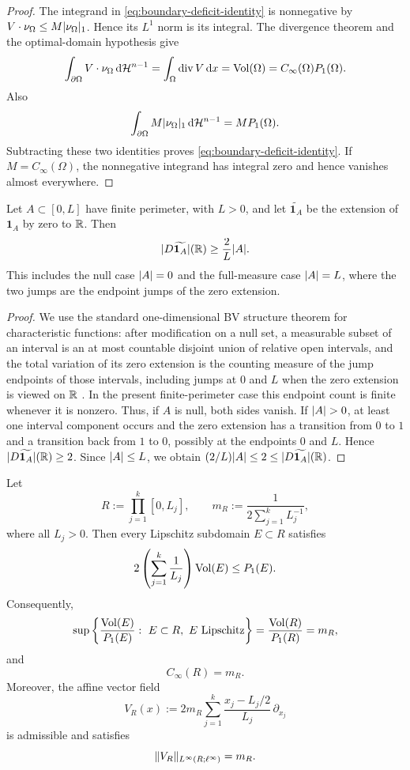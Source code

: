 \begin{proof}
The integrand in \eqref{eq:boundary-deficit-identity} is nonnegative by
$V\cdot\nu_\Omega\le M\lvert \nu_\Omega \rvert_1$. Hence its $L^1$ norm is its
integral. The divergence theorem and the optimal-domain hypothesis give
\[
\int_{\partial\Omega}V\cdot\nu_\Omega\,\mathrm{d}\mathcal{H}^{n-1}
=\int_\Omega\operatorname{div} V\,\mathrm{d} x
=\operatorname{Vol}(\Omega)
=C_\infty(\Omega)P_1(\Omega).
\]
Also
\[
\int_{\partial\Omega}M\lvert \nu_\Omega \rvert_1\,\mathrm{d}\mathcal{H}^{n-1}
=M P_1(\Omega).
\]
Subtracting these two identities proves
\eqref{eq:boundary-deficit-identity}. If $M=C_\infty(\Omega)$, the
nonnegative integrand has integral zero and hence vanishes almost everywhere.

\end{proof}

\begin{lemma}
\label{lem:one-dimensional-zero-extension}
Let $A\subset[0,L]$ have finite perimeter, with $L>0$, and let
$\widetilde{\mathbf 1_A}$ be the extension of $\mathbf 1_A$ by zero to
$\mathbb{R}$. Then
\[
|D\widetilde{\mathbf 1_A}|(\mathbb{R})\ge \frac{2}{L}\lvert A \rvert.
\]
This includes the null case $\lvert A \rvert=0$ and the full-measure case
$\lvert A \rvert=L$, where the two jumps are the endpoint jumps of the zero extension.
\end{lemma}

\begin{proof}
We use the standard one-dimensional BV structure theorem for characteristic
functions: after modification on a null set, a measurable subset of an interval
is an at most countable disjoint union of relative open intervals, and the total
variation of its zero extension is the counting measure of the jump endpoints
of those intervals, including jumps at $0$ and $L$ when the zero extension is
viewed on $\mathbb{R}$ \cite[Sec.~5.10]{EvansGariepy2015}.  In the present
finite-perimeter case this endpoint count is finite whenever it is nonzero.
Thus, if $A$ is null, both sides vanish. If $\lvert A \rvert>0$, at least one interval
component occurs and the zero extension has a transition from $0$ to $1$ and a
transition back from $1$ to $0$, possibly at the endpoints $0$ and $L$. Hence
$|D\widetilde{\mathbf 1_A}|(\mathbb{R})\ge2$. Since $\lvert A \rvert\le L$, we obtain
$(2/L)\lvert A \rvert\le2\le |D\widetilde{\mathbf 1_A}|(\mathbb{R})$.
\end{proof}

\begin{lemma}
\label{lem:box-self-cheeger}
Let
\[
R:=\prod_{j=1}^k[0,L_j],
\qquad
m_R:=\frac{1}{2\sum_{j=1}^k L_j^{-1}},
\]
where all $L_j>0$. Then every Lipschitz subdomain $E\subset R$ satisfies
\begin{equation}
\label{eq:box-anisotropic-ineq}
2\left(\sum_{j=1}^k\frac1{L_j}\right)\operatorname{Vol}(E)\le P_1(E).
\end{equation}
Consequently,
\[
\sup\left\{\frac{\Vol(E)}{P_1(E)}:\ E\subset R,\ E\ {\rm Lipschitz}\right\}
=
\frac{\Vol(R)}{P_1(R)}
=m_R,
\]
and
\[
C_\infty(R)=m_R.
\]
Moreover, the affine vector field
\[
V_R(x):=
2m_R\sum_{j=1}^k
\frac{x_j-L_j/2}{L_j}\,\partial_{x_j}
\]
is admissible and satisfies
\[
\lVert V_R \rVert_{L^\infty(R;\ell^\infty)}=m_R.
\]
\end{lemma}

